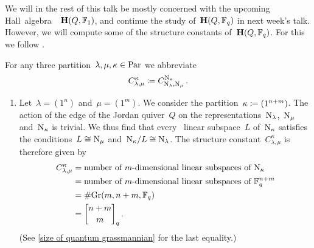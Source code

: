 \documentclass[a4paper,11pt]{scrartcl}
\begin{document}
We will in the rest of this talk be mostly concerned with the upcoming Hall~algebra~~$\mathbf{H}(Q, \mathbb{F}_1)$, and continue the study of~$\mathbf{H}(Q, \mathbb{F}_q)$ in next week’s talk.
However, we will compute some of the structure constants of~$\mathbf{H}(Q, \mathbb{F}_q)$.
For this we follow \cite[Example~2.2]{schiffmann_hall}.


\begin{example}
  For any three partition~$\lambda, \mu, \kappa \in \mathrm{Par}$ we abbreviate
  \[
    C^{\kappa}_{\lambda, \mu}
    \coloneqq
    C^{\mathrm{N}_{\kappa}}_{\mathrm{N}_{\lambda}, \mathrm{N}_{\mu}} \,.
  \]
  \begin{enumerate}
    \item
      Let~$\lambda = (1^n)$ and~$\mu = (1^m)$.
      We consider the partition~$\kappa \coloneqq (1^{n+m})$.
      The action of the edge of the Jordan quiver~$Q$ on the representations~$\mathrm{N}_\lambda$,~$\mathrm{N}_\mu$ and~$\mathrm{N}_\kappa$ is trivial.
      We thus find that every~ linear subspace~$L$ of~$\mathrm{N}_{\kappa}$ satisfies the conditions~$L \cong \mathrm{N}_\mu$ and~$\mathrm{N}_\kappa / L \cong \mathrm{N}_\lambda$.
      The structure constant~$C^{\kappa}_{\lambda, \mu}$ is therefore given by
      \begin{align*}
        C^{\kappa}_{\lambda, \mu}
        &=
        \text{number of~\dimensional{$m$} linear subspaces of~$\Nil_{\kappa}$}
        \\
        &=
        \text{number of~\dimensional{$m$} linear subspaces of~$\Finite_q^{n+m}$}
        \\
        &=
        \counting {\Gr(m, n+m, \Finite_q)}
        \\
        &=
        \qbinom{n+m}{m}_q \,.
      \end{align*}
      (See \cref{size of quantum grassmannian} for the last equality.)


\end{enumerate}
\end{example}
\end{document}
